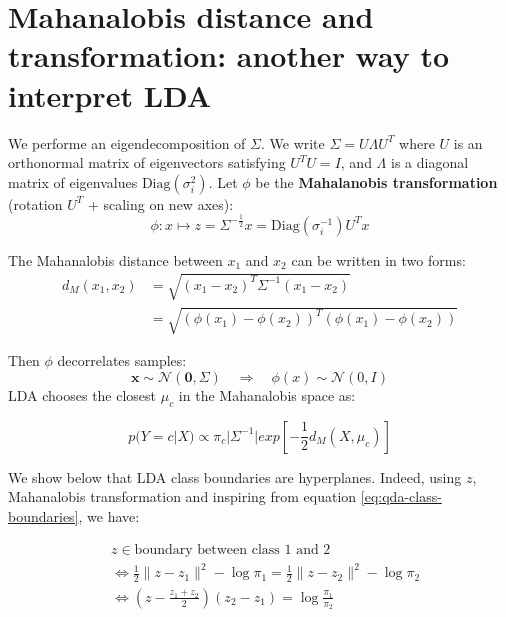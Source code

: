 \documentclass[12pt, a4paper]{article}
\theoremstyle{definition}
\numberwithin{figure}{section}
\numberwithin{equation}{section}
\numberwithin{table}{section}
\begin{document}
\section{Mahanalobis distance and transformation: another way to interpret LDA}
We performe an eigendecomposition of $\Sigma$. We write  $\Sigma = U \Lambda U^T$ where $U$ is an orthonormal matrix of eigenvectors satisfying $U^T U = I$, and $\Lambda$ is a diagonal matrix of eigenvalues $\text{Diag}(\sigma_i^2)$. Let $\phi$ be the \textbf{Mahalanobis transformation} (rotation $U^T$ + scaling on new axes):  
\begin{equation}
\phi: x \mapsto z = \Sigma^{-\frac{1}{2}} x = \text{Diag}(\sigma_i^{-1}) U^T x
\label{ex:qda-mahanalobis-func}
\end{equation}

The Mahanalobis distance between $x_1$ and $x_2$ can be written in two forms:
\begin{align}
d_M(x_1,x_2)
&=\sqrt{(x_1-x_2)^T \Sigma^{-1} (x_1-x_2)}\\
&=\sqrt{(\phi(x_1)-\phi(x_2))^T (\phi(x_1)-\phi(x_2))}
\label{eq:qda-mahanalobis-distance}
\end{align}

Then $\phi$ decorrelates samples:  
\begin{equation}
\mathbf{x} \sim \mathcal{N}(\mathbf{0}, \Sigma) \quad \Rightarrow \quad \phi(x) \sim \mathcal{N}(0, I)
\end{equation}
LDA chooses the closest $\mu_c$ in the Mahanalobis space as:

\begin{equation}
p(Y=c|X) \propto \pi_c |\Sigma^{-1}| exp \left[-\frac{1}{2}d_M(X,\mu_c)\right]
\end{equation}


We show below that LDA class boundaries are hyperplanes. Indeed, using $z$, Mahanalobis transformation and inspiring from equation \ref{eq:qda-class-boundaries}, we have:

\begin{align}
&z \in \text{boundary between class 1 and 2}\\
&\Leftrightarrow \frac{1}{2} \|z - z_1\|^2 - \log \pi_1 = \frac{1}{2} \|z - z_2\|^2 - \log \pi_2\\
&\Leftrightarrow \left(z - \frac{z_1 + z_2}{2}\right) (z_2 - z_1) = \log \frac{\pi_1}{\pi_2}
\end{align}

\end{document}
